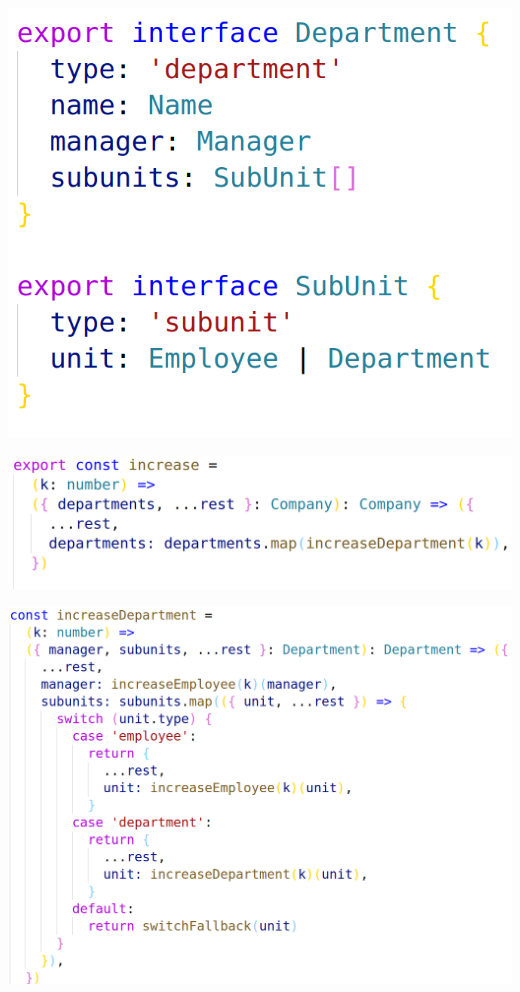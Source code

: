 \documentclass[14pt]{beamer}
\begin{document}
\begin{frame}
  \includegraphics[height=\textheight,width=\textwidth,keepaspectratio]{graphics/interface-subunit-ts.png}
\end{frame}

\begin{frame}
  \includegraphics[height=\textheight,width=\textwidth,keepaspectratio]{graphics/increase-naive-step1-ts.png}
\end{frame}

\begin{frame}
  \includegraphics[height=\textheight,width=\textwidth,keepaspectratio]{graphics/increase-naive-step2-ts.png}
\end{frame}
\end{document}
